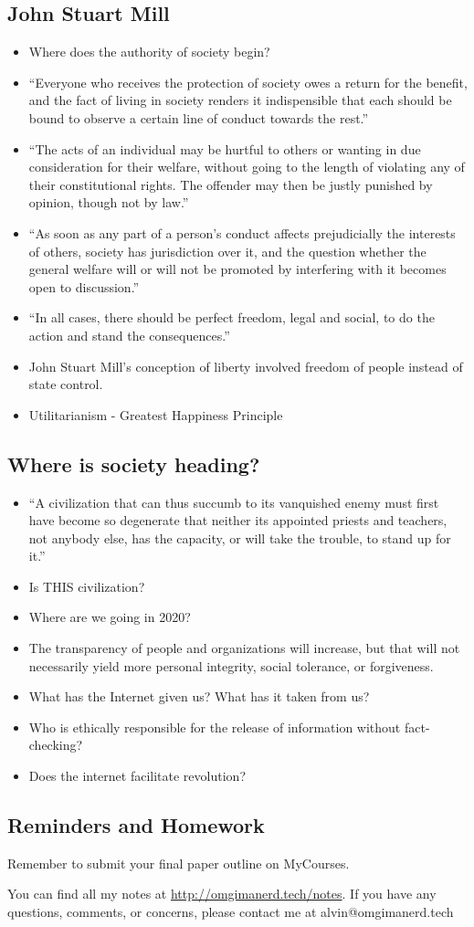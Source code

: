 \documentclass{article}
\begin{document}
\subsection*{John Stuart Mill}
\begin{itemize}
  \item Where does the authority of society begin?
  \item ``Everyone who receives the protection of society owes a return for the
    benefit, and the fact of living in society renders it indispensible that
    each should be bound to observe a certain line of conduct towards the
    rest.''
  \item ``The acts of an individual may be hurtful to others or wanting in due
    consideration for their welfare, without going to the length of violating
    any of their constitutional rights. The offender may then be justly
    punished by opinion, though not by law.''
  \item ``As soon as any part of a person's conduct affects prejudicially the
    interests of others, society has jurisdiction over it, and the question
    whether the general welfare will or will not be promoted by interfering
    with it becomes open to discussion.''
  \item ``In all cases, there should be perfect freedom, legal and social, to
    do the action and stand the consequences.''
  \item John Stuart Mill's conception of liberty involved freedom of people
    instead of state control.
  \item Utilitarianism - Greatest Happiness Principle
\end{itemize}

\subsection*{Where is society heading?}
\begin{itemize}
  \item ``A civilization that can thus succumb to its vanquished enemy must
    first have become so degenerate that neither its appointed priests and
    teachers, not anybody else, has the capacity, or will take the trouble, to
    stand up for it.''
  \item Is THIS civilization?
  \item Where are we going in 2020?
  \item The transparency of people and organizations will increase, but that
    will not necessarily yield more personal integrity, social tolerance, or
    forgiveness.
  \item What has the Internet given us? What has it taken from us?
  \item Who is ethically responsible for the release of information without
    fact-checking?
  \item Does the internet facilitate revolution?
\end{itemize}

\subsection*{Reminders and Homework}
Remember to submit your final paper outline on MyCourses.

\begin{center}
  You can find all my notes at \url{http://omgimanerd.tech/notes}. If you have
  any questions, comments, or concerns, please contact me at
  alvin@omgimanerd.tech
\end{center}
\end{document}
